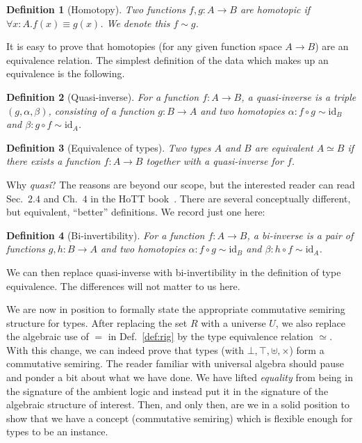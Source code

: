 \documentclass{article}
\newtheorem{defn}{Definition}[section]
\begin{document}
\begin{defn}[Homotopy]
\label{def:homotopy}
Two functions $f,g:A \rightarrow B$ are \emph{homotopic} if
$\forall x:A. f(x) \equiv g(x)$. We denote this $f \sim g$.
\end{defn}

\noindent It is easy to prove that homotopies (for any given function
space $A \rightarrow B$) are an equivalence relation.  The simplest
definition of the data which makes up an equivalence is the following.

\begin{defn}[Quasi-inverse]
\label{def:quasi}
For a function $f : A \rightarrow B$, a \emph{quasi-inverse} is a
triple $(g, \alpha, \beta)$, consisting of a function
$g : B \rightarrow A$ and two homotopies
$\alpha : f \circ g \sim \mathrm{id}_B$ and
$\beta : g \circ f \sim \mathrm{id}_A$.
\end{defn}

\begin{defn}[Equivalence of types]
  Two types $A$ and $B$ are equivalent $A \simeq B$ if there exists a
  function $f : A \rightarrow B$ together with a quasi-inverse for $f$.
\end{defn}

\noindent Why \emph{quasi}? The reasons are beyond our scope, but the
interested reader can read Sec.~$2.4$ and Ch.~$4$ in the HoTT
book~\cite{hottbook}.  There are several conceptually different, but
equivalent, ``better'' definitions.  We record just one here:

\begin{defn}[Bi-invertibility]
\label{def:biinv}
For a function $f : A \rightarrow B$, a \emph{bi-inverse} is a
pair of functions $g,h : B \rightarrow A$ and two homotopies
$\alpha : f \circ g \sim \mathrm{id}_B$ and
$\beta : h \circ f \sim \mathrm{id}_A$.
\end{defn}

\noindent We can then replace quasi-inverse with bi-invertibility in
the definition of type equivalence. The differences will not matter to
us here.

We are now in position to formally state the appropriate commutative
semiring structure for types. After replacing the set $R$ with a
universe $U$, we also replace the algebraic use of $=$ in
Def.~\ref{def:rig} by the type equivalence relation $\simeq$. With
this change, we can indeed prove that types (with
$\bot, \top, \uplus, \times$) form a commutative semiring. The reader
familiar with universal algebra should pause and ponder a bit about
what we have done. We have lifted \emph{equality} from being in the
signature of the ambient logic and instead put it in the signature of
the algebraic structure of interest. Then, and only then, are we in a
solid position to show that we have a concept (commutative semiring)
which is flexible enough for types to be an instance.
\end{document}
